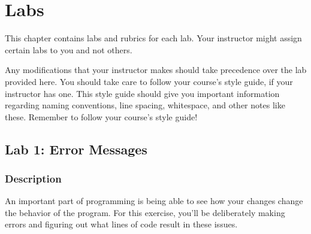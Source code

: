 \chapter*{Labs}
This chapter contains labs and rubrics for each lab. Your instructor might assign certain labs to you and not others.\par
Any modifications that your instructor makes should take precedence over the lab provided here. You should take care to follow your course's style guide, if your instructor has one. This style guide should give you important information regarding naming conventions, line spacing, whitespace, and other notes like these. Remember to follow your course's style guide!
\section*{Lab 1: Error Messages}
\subsection*{Description}
An important part of programming is being able to see how your changes change the behavior of the program. For this exercise, you'll be deliberately making errors and figuring out what lines of code result in these issues.
